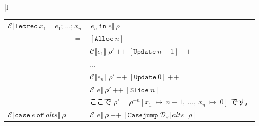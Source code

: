 \documentclass{jbook}
\begin{document}
\begin{tabular} {|l|}
\begin{tabular}{r c l}
		\multicolumn{3}{l}{$\mathcal{E} \llbracket \texttt{letrec} ~ x_1 ~ \texttt{=} ~ e_1\texttt{;} ~  \ldots \texttt{;} ~ x_n ~ \texttt{=} ~ e_n ~ \texttt{in} ~ e \rrbracket ~ \rho$}                                                                                                                               \\
		                                                                                                           & $=$ & $\left[\texttt{Alloc} ~ n\right] ~ \texttt{++}$                                                                                                                                              \\
		                                                                                                           &     & $\mathcal{C} \llbracket e_1 \rrbracket ~ \rho' ~ \texttt{++} ~ \left[\texttt{Update} ~ n - 1\right] ~ \texttt{++}$                                                                           \\
		                                                                                                           &     & $\ldots$                                                                                                                                                                                     \\
		                                                                                                           &     & $\mathcal{C} \llbracket e_n \rrbracket ~ \rho' ~ \texttt{++} ~ \left[\texttt{Update} ~ 0\right] ~ \texttt{++}$                                                                               \\
		                                                                                                           &     & $\mathcal{E} \llbracket e \rrbracket ~ \rho' ~ \texttt{++} ~ \left[\texttt{Slide} ~ n\right]$                                                                                                \\
		                                                                                                           &     & ここで $\rho' = \rho^{+n} \left[x_1 ~ \mapsto ~ n - 1, ~ \ldots , ~ x_n ~ \mapsto ~ 0\right]$ です。                                                                                         \\
		$\mathcal{E} \llbracket \texttt{case} ~ e ~ \texttt{of} ~ alts \rrbracket ~ \rho$                          & $=$ & $\mathcal{E} \llbracket e \rrbracket ~ \rho ~ \texttt{++} ~ \left[\texttt{Casejump} ~ \mathcal{D_E} \llbracket alts \rrbracket ~ \rho \right]$                                               \\

\end{tabular}
\end{tabular}
\end{document}

